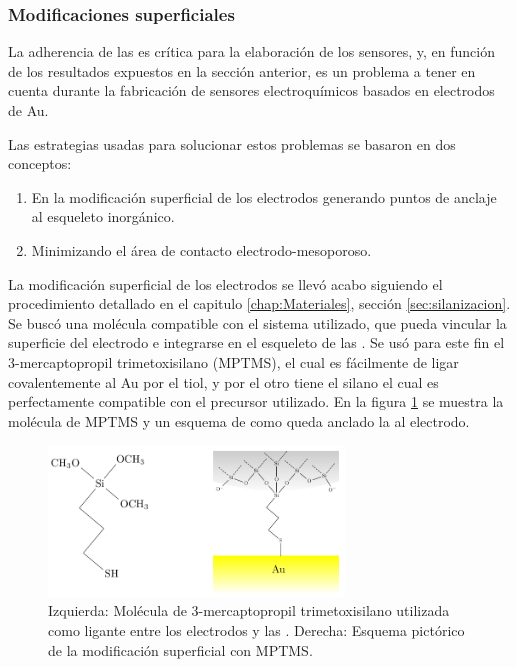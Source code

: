 		\subsubsection{Modificaciones superficiales}\label{sec:adherencia}

			La adherencia de las \pdm\space es crítica para la elaboración de los sensores, y, en función de los resultados expuestos en la sección anterior, es un problema a tener en cuenta durante la fabricación de sensores electroquímicos basados en electrodos de Au.

			Las estrategias usadas para solucionar estos problemas se basaron en dos conceptos:
				\begin{enumerate}

					\item En la modificación superficial de los electrodos generando puntos de anclaje al esqueleto inorgánico.

					\item Minimizando el área de contacto electrodo-mesoporoso.

					\end{enumerate}
			La modificación superficial de los electrodos se llevó acabo siguiendo el procedimiento detallado en el capitulo \ref{chap:Materiales}, sección \ref{sec:silanizacion}. Se buscó una molécula compatible con el sistema utilizado, que pueda vincular la superficie del electrodo e integrarse en el esqueleto de las \pdm. Se usó para este fin el 3-mercaptopropil trimetoxisilano (MPTMS), el cual es fácilmente de ligar covalentemente al Au\cite{Gosser} por el tiol, y por el otro tiene el silano el cual es perfectamente compatible con el precursor utilizado\cite{Wu2014,Wu2013,Chen2011}. En la figura \ref{fig:mod_sup} se muestra la molécula de MPTMS y un esquema de como queda anclado la \pdm\space al electrodo.
					\begin{figure}[!ht]
							\begin{center}
							\includegraphics[width=0.70\textwidth]{Esquemas/mod_sup.pdf}
							\caption[Modificación superficial de los electrodos.]{Izquierda: Molécula de  3-mercaptopropil trimetoxisilano utilizada como ligante entre los electrodos y las \pdm. Derecha: Esquema pictórico de la modificación superficial con MPTMS.}
							\label{fig:mod_sup}
							\end{center}
							\end{figure}

